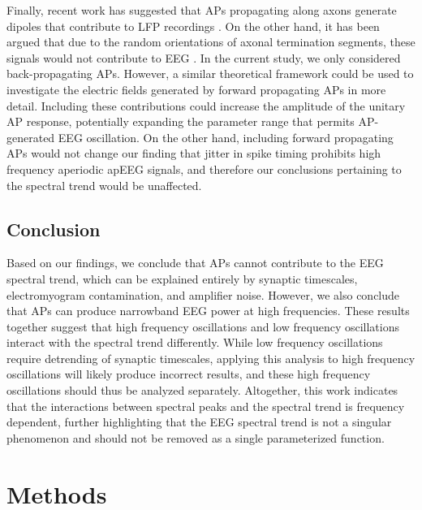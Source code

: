 Finally, recent work has suggested that APs propagating along axons generate dipoles that contribute to LFP recordings \cite{McColgan2017}. On the other hand, it has been argued that due to the random orientations of axonal termination segments, these signals would not contribute to EEG \cite{Thio2023}. In the current study, we only considered back-propagating APs. However, a similar theoretical framework could be used to investigate the electric fields generated by forward propagating APs in more detail. Including these contributions could increase the amplitude of the unitary AP response, potentially expanding the parameter range that permits AP-generated EEG oscillation. On the other hand, including forward propagating APs would not change our finding that jitter in spike timing prohibits high frequency aperiodic apEEG signals, and therefore our conclusions pertaining to the spectral trend would be unaffected.

\subsection{Conclusion}
Based on our findings, we conclude that APs cannot contribute to the EEG spectral trend, which can be explained entirely by synaptic timescales, electromyogram contamination, and amplifier noise. However, we also conclude that APs can produce narrowband EEG power at high frequencies. These results together suggest that high frequency oscillations and low frequency oscillations interact with the spectral trend differently. While low frequency oscillations require detrending of synaptic timescales, applying this analysis to high frequency oscillations will likely produce incorrect results, and these high frequency oscillations should thus be analyzed separately. Altogether, this work indicates that the interactions between spectral peaks and the spectral trend is frequency dependent, further highlighting that the EEG spectral trend is not a singular phenomenon and should not be removed as a single parameterized function. 

\pagebreak

\section{Methods}

